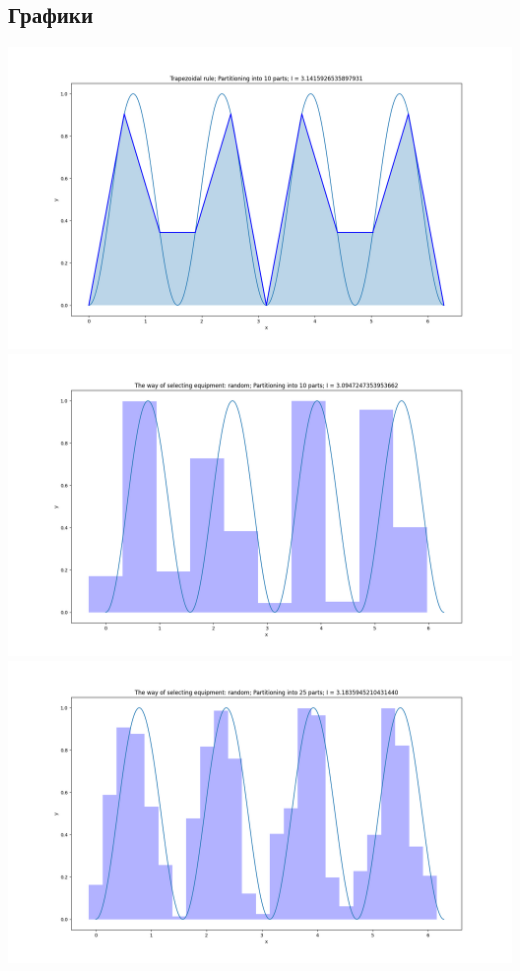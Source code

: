 \documentclass{article}
\begin{document}
\begin{center}
\subsection*{Графики}
\includegraphics[scale = 0.5]{10_trapezoidal.png}
\includegraphics[scale = 0.5]{10_random.png}
\includegraphics[scale = 0.5]{25_random.png}

\end{center}
\end{document}
